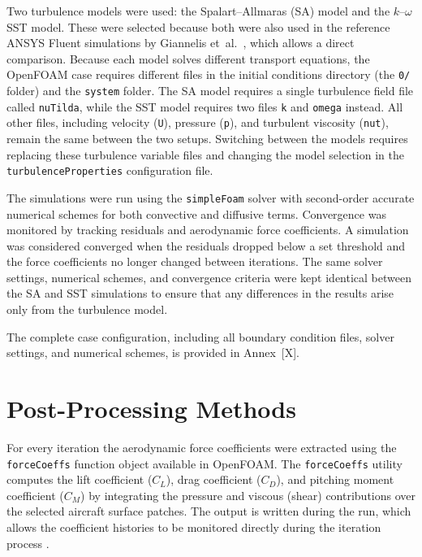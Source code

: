 Two turbulence models were used: the Spalart--Allmaras (SA) model and the $k$--$\omega$ SST model. These were selected because both were also used in the reference ANSYS Fluent simulations by Giannelis et~al.\ \cite{Giannelis2023SSAMGen5}, which allows a direct comparison. Because each model solves different transport equations, the OpenFOAM case requires different files in the initial conditions directory (the \texttt{0/} folder) and the \texttt{system} folder. The SA model requires a single turbulence field file called \texttt{nuTilda}, while the SST model requires two files \texttt{k} and \texttt{omega} instead. All other files, including velocity (\texttt{U}), pressure (\texttt{p}), and turbulent viscosity (\texttt{nut}), remain the same between the two setups. Switching between the models requires replacing these turbulence variable files and changing the model selection in the \texttt{turbulenceProperties} configuration file.

The simulations were run using the \texttt{simpleFoam} solver with second-order accurate numerical schemes for both convective and diffusive terms. Convergence was monitored by tracking residuals and aerodynamic force coefficients. A simulation was considered converged when the residuals dropped below a set threshold and the force coefficients no longer changed between iterations. The same solver settings, numerical schemes, and convergence criteria were kept identical between the SA and SST simulations to ensure that any differences in the results arise only from the turbulence model.

The complete case configuration, including all boundary condition files, solver settings, and numerical schemes, is provided in Annex~[X].

\section{Post-Processing Methods}


For every iteration the aerodynamic force coefficients were extracted using the \texttt{forceCoeffs} function object available in OpenFOAM. The \texttt{forceCoeffs} utility computes the lift coefficient ($C_L$), drag coefficient ($C_D$), and pitching moment coefficient ($C_M$) by integrating the pressure and viscous (shear) contributions over the selected aircraft surface patches. The output is written during the run, which allows the coefficient histories to be monitored directly during the iteration process \cite{OpenFOAMForceCoeffs,OpenFOAMForces}.

